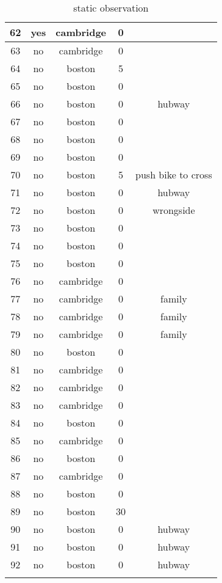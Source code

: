 \begin{longtable}{|c|c|c|c|c|}
62 & yes & cambridge & 0 & \\ \hline
63 & no & cambridge & 0 & \\ \hline
64 & no & boston & 5 \\ \hline
65 & no & boston & 0 & \\ \hline
66 & no & boston & 0 & hubway \\ \hline
67 & no & boston & 0 & \\ \hline
68 & no & boston & 0 & \\ \hline
69 & no & boston & 0 & \\ \hline
70 & no & boston & 5 & push bike to cross \\ \hline
71 & no & boston & 0 & hubway \\ \hline
72 & no & boston & 0 & wrongside \\ \hline
73 & no & boston & 0 & \\ \hline
74 & no & boston & 0 & \\ \hline
75 & no & boston & 0 & \\ \hline
76 & no & cambridge & 0 & \\ \hline
77 & no & cambridge & 0 & family \\ \hline
78 & no & cambridge & 0 & family \\ \hline
79 & no & cambridge & 0 & family \\ \hline
80 & no & boston & 0 & \\ \hline
81 & no & cambridge & 0 & \\ \hline
82 & no & cambridge & 0 & \\ \hline
83 & no & cambridge & 0 & \\ \hline
84 & no & boston & 0 & \\ \hline
85 & no & cambridge & 0 & \\ \hline
86 & no & boston & 0 & \\ \hline
87 & no & cambridge & 0 & \\ \hline
88 & no & boston & 0 & \\ \hline
89 & no & boston & 30 & \\ \hline
90 & no & boston & 0 & hubway \\ \hline
91 & no & boston & 0 & hubway \\ \hline
92 & no & boston & 0 & hubway \\ \hline

\caption{static observation}
\label{tab:static_observation}
\end{longtable}
